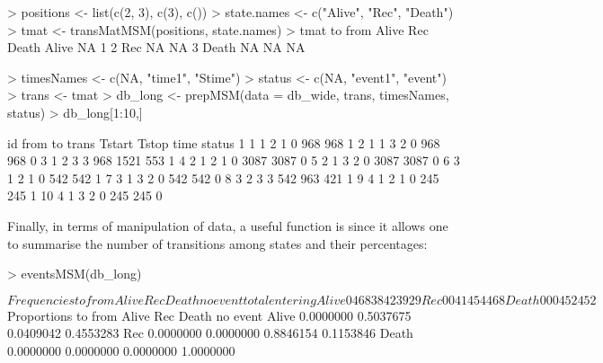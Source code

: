 \begin{example}
> positions <- list(c(2, 3), c(3), c())
> state.names <- c("Alive", "Rec",  "Death")
> tmat <- transMatMSM(positions, state.names)
> tmat
       to
from    Alive Rec Death
  Alive    NA   1     2
  Rec      NA  NA     3
  Death    NA  NA    NA
  
> timesNames <- c(NA, "time1", "Stime")
> status <- c(NA, "event1", "event")
> trans <- tmat
> db_long <- prepMSM(data = db_wide, trans, timesNames, status)
> db_long[1:10,]


   id from to trans Tstart Tstop time status
1   1    1  2     1      0   968  968      1
2   1    1  3     2      0   968  968      0
3   1    2  3     3    968  1521  553      1
4   2    1  2     1      0  3087 3087      0
5   2    1  3     2      0  3087 3087      0
6   3    1  2     1      0   542  542      1
7   3    1  3     2      0   542  542      0
8   3    2  3     3    542   963  421      1
9   4    1  2     1      0   245  245      1
10  4    1  3     2      0   245  245      0
\end{example}

Finally, in terms of manipulation of data, a useful function is  since it allows one to summarise the number of transitions among states and their percentages:

\begin{example}
> eventsMSM(db_long)

$Frequencies
       to
from    Alive Rec Death no event total entering
  Alive     0 468    38      423            929
  Rec       0   0   414       54            468
  Death     0   0     0      452            452

$Proportions
       to
from        Alive       Rec     Death  no event
  Alive 0.0000000 0.5037675 0.0409042 0.4553283
  Rec   0.0000000 0.0000000 0.8846154 0.1153846
  Death 0.0000000 0.0000000 0.0000000 1.0000000
\end{example}

